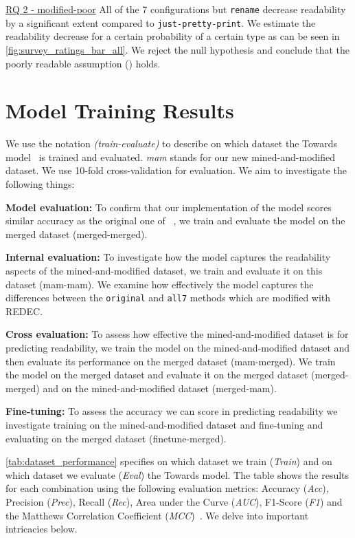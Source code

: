 \documentclass[%
class=scrreprt,
chapterprefix=false,%
open=right,%
twoside=true,%
paper=a4,%
logofile={Logo\_zentral\_farbig\_EN.png},%
thesistype=master,%
UKenglish,%
]{se2thesis}
\theoremstyle{definition}
\newcommand{\rdh}{REDEC\xspace}
\newcommand{\none}{just-pretty-print\xspace} %
\newcommand{\nonet}{\texttt{\none}\xspace} %
\begin{document}
	\begin{summary}{\hyperref[modified-poor]{RQ 2 - modified-poor}}
		All of the 7 configurations but \texttt{rename} decrease readability by a significant extent compared to \nonet. We estimate the readability decrease for a certain probability of a certain type as can be seen in \autoref{fig:survey_ratings_bar_all}. We reject the null hypothesis and conclude that the poorly readable assumption () holds.
	\end{summary}

\section{Model Training Results} \label{Model training results}
	We use the notation \textit{(train-evaluate)} to describe on which dataset the Towards model~\cite{mi2022towards} is trained and evaluated. \textit{mam} stands for our new mined-and-modified dataset. We use 10-fold cross-validation for evaluation.
	We aim to investigate the following things:
	
	\textbf{Model evaluation:}
	To confirm that our implementation of the model scores similar accuracy as the original one of \citeauthor{mi2022towards}~\cite{mi2022towards}, we train and evaluate the model on the merged dataset (merged-merged).
	
	\textbf{Internal evaluation:} 
	To investigate how the model captures the readability aspects of the mined-and-modified dataset, we train and evaluate it on this dataset (mam-mam). We examine how effectively the model captures the differences between the \texttt{original} and \texttt{all7} methods which are modified with \rdh.
	
	\textbf{Cross evaluation:} 
	To assess how effective the mined-and-modified dataset is for predicting readability, we train the model on the mined-and-modified dataset and then evaluate its performance on the merged dataset (mam-merged). We train the model on the merged dataset and evaluate it on the merged dataset (merged-merged) and on the mined-and-modified dataset (merged-mam).
	
	\textbf{Fine-tuning:} 
	To assess the accuracy we can score in predicting readability we investigate training on the mined-and-modified dataset and fine-tuning and evaluating on the merged dataset (finetune-merged).		
	
	\autoref{tab:dataset_performance} specifies on which dataset we train (\textit{Train}) and on which dataset we evaluate (\textit{Eval}) the Towards model. The table shows the results for each combination using the following evaluation metrics: Accuracy (\textit{Acc}), Precision (\textit{Prec}), Recall (\textit{Rec}), Area under the Curve (\textit{AUC}), F1-Score (\textit{F1}) and the Matthews Correlation Coefficient (\textit{MCC})~\cite{chicco2020advantages}. We delve into important intricacies below.
		
\end{document}
